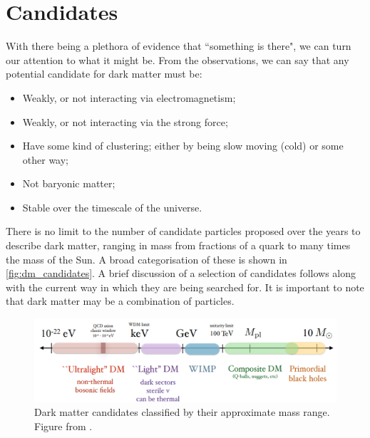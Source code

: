 \section{Candidates}
\par
With there being a plethora of evidence that ``something is there", we can turn our attention to what it might be.
From the observations, we can say that any potential candidate for dark matter must be:
\begin{itemize}
    \item Weakly, or not interacting via electromagnetism;
    \item Weakly, or not interacting via the strong force;
    \item Have some kind of clustering; either by being slow moving (cold) or some other way;
    \item Not baryonic matter;
    \item Stable over the timescale of the universe.
\end{itemize}
There is no limit to the number of candidate particles proposed over the years to describe dark matter, ranging in mass from fractions of a quark to many times the mass of the Sun.
A broad categorisation of these is shown in \autoref{fig:dm_candidates}.
A brief discussion of a selection of candidates follows along with the current way in which they are being searched for.
It is important to note that dark matter may be a combination of particles.
\begin{figure}[!h]
    \centering
    \includegraphics[width=15cm]{Figures/DarkMatterEvidence/dark_matter_candidates.png}
    \caption{Dark matter candidates classified by their approximate mass range. Figure from \cite{dm_figure_candidates_ref}.}
    \label{fig:dm_candidates}
\end{figure}

